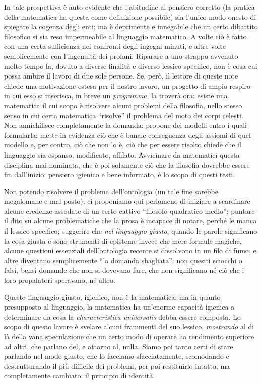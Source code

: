 \documentclass[a4paper, 11pt]{article}
\begin{document}
In tale prospettiva è auto-evidente che l'abitudine al pensiero corretto (la pratica della matematica ha questa come definizione possibile) sia l'unico modo onesto di spiegare la cogenza degli enti; ma è deprimente e innegabile che un certo dibattito filosofico si sia reso impermeabile al linguaggio matematico. A volte ciò è fatto con una certa sufficienza nei confronti degli ingegni minuti, e altre volte semplicemente con l'ingenuità dei profani. Riparare a uno strappo avvenuto molto tempo fa, dovuto a diverse finalità e diverso lessico specifico, non è cosa cui possa ambire il lavoro di due sole persone. Se, però, il lettore di queste note chiede una motivazione estesa per il nostro lavoro, un progetto di ampio respiro in cui esso si inserisca, in breve un \emph{programma}, la troverà ora: esiste una matematica il cui scopo è risolvere alcuni problemi della filosofia, nello stesso senso in cui certa matematica ``risolve'' il problema del moto dei corpi celesti. Non annichilisce completamente la domanda: propone dei modelli entro i quali formularla; mette in evidenza ciò che è banale conseguenza degli assiomi di quel modello e, per contro, ciò che non lo è, ciò che per essere risolto chiede che il linguaggio sia espanso, modificato, affilato. Avvicinare da matematici questa disciplina mai nominata, che è poi solamente ciò che la filosofia dovrebbe essere fin dall'inizio: pensiero igienico e bene informato, è lo scopo di questi testi.

Non potendo risolvere il problema dell'ontologia (un tale fine sarebbe megalomane e mal posto), ci proponiamo qui perlomeno di iniziare a scardinare alcune credenze assodate di un certo cattivo ``filosofo quadratico medio''; puntare il dito su alcune problematiche che la prosa è incapace di notare, perché le manca il lessico specifico; suggerire che \emph{nel linguaggio giusto}, quando le parole significano la cosa giusta e sono strumenti di episteme invece che mere formule magiche, alcune questioni essenziali dell'ontologia recente si dissolvono in un filo di fumo, e altre diventano semplicemente ``la domanda sbagliata'': non quesiti sciocchi o falsi, bensì domande che non si dovevano fare, che non significano né ciò che i loro propalatori speravano, né altro.

Questo linguaggio giusto, igienico, non è la matematica; ma in quanto presupposto al linguaggio, la matematica ha un'enorme capacità igienica a determinare da cosa la \emph{characteristica universalis} debba essere composta. Lo scopo di questo lavoro è svelare alcuni frammenti del suo lessico, \emph{mostrando} al di là della vana speculazione che un certo modo di operare ha rendimento superiore ad altri, che parlano del, e attorno al, nulla. Siamo poi tanto certi di stare parlando nel modo giusto, che lo facciamo sfacciatamente, scomodando e destrutturando il più difficile dei problemi, per poi restituirlo intatto, ma completamente cambiato: il principio di identità. 
\end{document}
